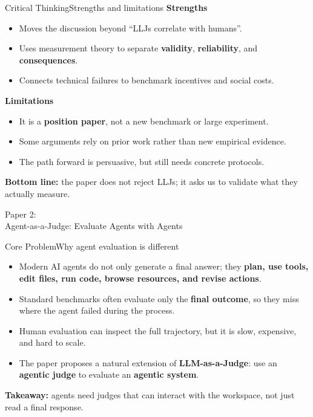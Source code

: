 \documentclass[10pt]{beamer}
\begin{document}
	\begin{frame}{Critical Thinking}{Strengths and limitations}
		\textbf{Strengths}
		\begin{itemize}
			\item Moves the discussion beyond ``LLJs correlate with humans''.
			\item Uses measurement theory to separate \textbf{validity}, \textbf{reliability}, and \textbf{consequences}.
			\item Connects technical failures to benchmark incentives and social costs.
		\end{itemize}
		
		\vspace{0.1cm}
		\textbf{Limitations}
		\begin{itemize}
			\item It is a \textbf{position paper}, not a new benchmark or large experiment.
			\item Some arguments rely on prior work rather than new empirical evidence.
			\item The path forward is persuasive, but still needs concrete protocols.
		\end{itemize}
		
		\vspace{0.1cm}
		\textbf{Bottom line:} the paper does not reject LLJs; it asks us to validate what they actually measure.
	\end{frame}
	
	
	\begin{frame}[standout]
		\hypertarget{paper2}{}
		\Large Paper 2:\\Agent-as-a-Judge: Evaluate Agents with Agents
	\end{frame}
	\begin{frame}{Core Problem}{Why agent evaluation is different}
		\begin{itemize}
			\item Modern AI agents do not only generate a final answer; they \textbf{plan, use tools, edit files, run code, browse resources, and revise actions}.
			\item Standard benchmarks often evaluate only the \textbf{final outcome}, so they miss where the agent failed during the process.
			\item Human evaluation can inspect the full trajectory, but it is slow, expensive, and hard to scale.
			\item The paper proposes a natural extension of \textbf{LLM-as-a-Judge}: use an \textbf{agentic judge} to evaluate an \textbf{agentic system}.
		\end{itemize}
		\vspace{0.2cm}
		\textbf{Takeaway:} agents need judges that can interact with the workspace, not just read a final response.
	\end{frame}
	
\end{document}
